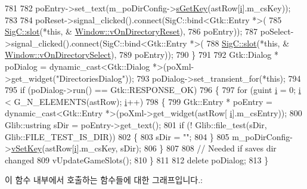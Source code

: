 \begin{DoxyCode}
781 
782     poEntry->set\_text(m\_poDirConfig->\mbox{\hyperlink{class_v_b_a_1_1_config_1_1_section_a7ac9dfabf38bc1db83a6017e130f04ac}{sGetKey}}(astRow[\mbox{\hyperlink{expr-lex_8cpp_acb559820d9ca11295b4500f179ef6392}{i}}].m\_csKey));
783 
784     poReset->signal\_clicked().connect(SigC::bind<Gtk::Entry *>(
785                                         \mbox{\hyperlink{namespace_sig_c_a92e4f19202b77e78ac1db05f5a62f6b6}{SigC::slot}}(*\textcolor{keyword}{this}, &
      \mbox{\hyperlink{class_v_b_a_1_1_window_aedc6f08a9c1f1a54ec41347f96dfd213}{Window::vOnDirectoryReset}}),
786                                         poEntry));
787     poSelect->signal\_clicked().connect(SigC::bind<Gtk::Entry *>(
788                                          \mbox{\hyperlink{namespace_sig_c_a92e4f19202b77e78ac1db05f5a62f6b6}{SigC::slot}}(*\textcolor{keyword}{this}, &
      \mbox{\hyperlink{class_v_b_a_1_1_window_ab2aa067d967ea52a685574fc09c11f33}{Window::vOnDirectorySelect}}),
789                                          poEntry));
790   \}
791 
792   Gtk::Dialog * poDialog = \textcolor{keyword}{dynamic\_cast<}Gtk::Dialog *\textcolor{keyword}{>}(poXml->get\_widget(\textcolor{stringliteral}{"DirectoriesDialog"}));
793   poDialog->set\_transient\_for(*\textcolor{keyword}{this});
794 
795   \textcolor{keywordflow}{if} (poDialog->run() == Gtk::RESPONSE\_OK)
796   \{
797     \textcolor{keywordflow}{for} (guint \mbox{\hyperlink{expr-lex_8cpp_acb559820d9ca11295b4500f179ef6392}{i}} = 0; \mbox{\hyperlink{expr-lex_8cpp_acb559820d9ca11295b4500f179ef6392}{i}} < G\_N\_ELEMENTS(astRow); \mbox{\hyperlink{expr-lex_8cpp_acb559820d9ca11295b4500f179ef6392}{i}}++)
798     \{
799       Gtk::Entry * poEntry = \textcolor{keyword}{dynamic\_cast<}Gtk::Entry *\textcolor{keyword}{>}(poXml->get\_widget(astRow[
      \mbox{\hyperlink{expr-lex_8cpp_acb559820d9ca11295b4500f179ef6392}{i}}].m\_csEntry));
800       Glib::ustring sDir = poEntry->get\_text();
801       \textcolor{keywordflow}{if} (! Glib::file\_test(sDir, Glib::FILE\_TEST\_IS\_DIR))
802       \{
803         sDir = \textcolor{stringliteral}{""};
804       \}
805       m\_poDirConfig->\mbox{\hyperlink{class_v_b_a_1_1_config_1_1_section_a57e1b95cbea40db71c093381beff4b0e}{vSetKey}}(astRow[\mbox{\hyperlink{expr-lex_8cpp_acb559820d9ca11295b4500f179ef6392}{i}}].m\_csKey, sDir);
806     \}
807 
808     \textcolor{comment}{// Needed if saves dir changed}
809     vUpdateGameSlots();
810   \}
811 
812   \textcolor{keyword}{delete} poDialog;
813 \}
\end{DoxyCode}
이 함수 내부에서 호출하는 함수들에 대한 그래프입니다.\+:
